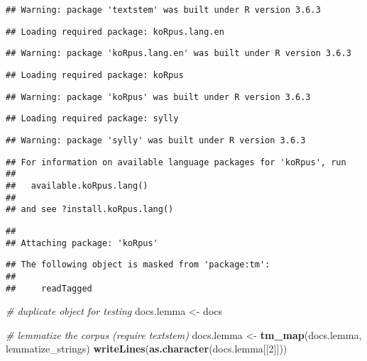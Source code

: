 \documentclass[
]{article}
\newenvironment{Shaded}{\begin{snugshade}}{\end{snugshade}}
\newcommand{\CommentTok}[1]{\textcolor[rgb]{0.56,0.35,0.01}{\textit{#1}}}
\newcommand{\DecValTok}[1]{\textcolor[rgb]{0.00,0.00,0.81}{#1}}
\newcommand{\KeywordTok}[1]{\textcolor[rgb]{0.13,0.29,0.53}{\textbf{#1}}}
\newcommand{\NormalTok}[1]{#1}
\newcommand{\StringTok}[1]{\textcolor[rgb]{0.31,0.60,0.02}{#1}}
\begin{document}
\begin{verbatim}
## Warning: package 'textstem' was built under R version 3.6.3
\end{verbatim}

\begin{verbatim}
## Loading required package: koRpus.lang.en
\end{verbatim}

\begin{verbatim}
## Warning: package 'koRpus.lang.en' was built under R version 3.6.3
\end{verbatim}

\begin{verbatim}
## Loading required package: koRpus
\end{verbatim}

\begin{verbatim}
## Warning: package 'koRpus' was built under R version 3.6.3
\end{verbatim}

\begin{verbatim}
## Loading required package: sylly
\end{verbatim}

\begin{verbatim}
## Warning: package 'sylly' was built under R version 3.6.3
\end{verbatim}

\begin{verbatim}
## For information on available language packages for 'koRpus', run
## 
##   available.koRpus.lang()
## 
## and see ?install.koRpus.lang()
\end{verbatim}

\begin{verbatim}
## 
## Attaching package: 'koRpus'
\end{verbatim}

\begin{verbatim}
## The following object is masked from 'package:tm':
## 
##     readTagged
\end{verbatim}

\begin{Shaded}
\begin{Highlighting}[]
\CommentTok{# duplicate object for testing}
\NormalTok{docs.lemma <-}\StringTok{ }\NormalTok{docs}

\CommentTok{# lemmatize the corpus (require textstem)}
\NormalTok{docs.lemma <-}\StringTok{ }\KeywordTok{tm_map}\NormalTok{(docs.lemma, lemmatize_strings)}
\KeywordTok{writeLines}\NormalTok{(}\KeywordTok{as.character}\NormalTok{(docs.lemma[[}\DecValTok{2}\NormalTok{]]))}
\end{Highlighting}
\end{Shaded}
\end{document}
